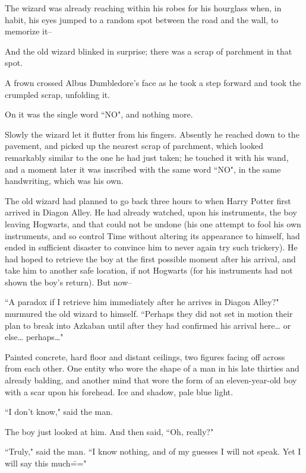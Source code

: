 The wizard was already reaching within his robes for his hourglass when, in habit, his eyes jumped to a random spot between the road and the wall, to memorize it\---

And the old wizard blinked in surprise; there was a scrap of parchment in that spot.

A frown crossed Albus Dumbledore's face as he took a step forward and took the crumpled scrap, unfolding it.

On it was the single word ``NO", and nothing more.

Slowly the wizard let it flutter from his fingers. Absently he reached down to the pavement, and picked up the nearest scrap of parchment, which looked remarkably similar to the one he had just taken; he touched it with his wand, and a moment later it was inscribed with the same word ``NO", in the same handwriting, which was his own.

The old wizard had planned to go back three hours to when Harry Potter first arrived in Diagon Alley. He had already watched, upon his instruments, the boy leaving Hogwarts, and that could not be undone (his one attempt to fool his own instruments, and so control Time without altering its appearance to himself, had ended in sufficient disaster to convince him to never again try such trickery). He had hoped to retrieve the boy at the first possible moment after his arrival, and take him to another safe location, if not Hogwarts (for his instruments had not shown the boy's return). But now\---

``A paradox if I retrieve him immediately after he arrives in Diagon Alley?" murmured the old wizard to himself. ``Perhaps they did not set in motion their plan to break into Azkaban until after they had confirmed his arrival here{\ldots} or else{\ldots} perhaps{\ldots}"

\later

Painted concrete, hard floor and distant ceilings, two figures facing off across from each other. One entity who wore the shape of a man in his late thirties and already balding, and another mind that wore the form of an eleven-year-old boy with a scar upon his forehead. Ice and shadow, pale blue light.

``I don't know," said the man.

The boy just looked at him. And then said, ``Oh, really?"

``Truly," said the man. ``I know nothing, and of my guesses I will not speak. Yet I will say this much\==="

